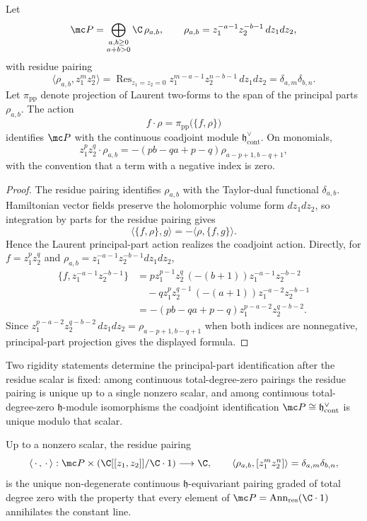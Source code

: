\documentclass[11pt]{memoir}
\begin{document}
\begin{prop}\label{prop:principal-part-coadjoint}
  Let
  $$\mc P=\bigoplus_{\substack{a,b\geq0\\a+b>0}}
    \C\,\rho_{a,b},\qquad
    \rho_{a,b}=z_1^{-a-1}z_2^{-b-1}\,dz_1dz_2,$$
  with residue pairing
  $$\langle \rho_{a,b},z_1^mz_2^n\rangle
    =\operatorname{Res}_{z_1=z_2=0}
      z_1^{m-a-1}z_2^{n-b-1}\,dz_1dz_2
    =\delta_{a,m}\delta_{b,n}.$$
  Let $\pi_{\mathrm{pp}}$ denote projection of Laurent two-forms to the span of
  the principal parts $\rho_{a,b}$. The action
  $$f\cdot\rho=\pi_{\mathrm{pp}}\bigl(\{f,\rho\}\bigr)$$
  identifies $\mc P$ with the continuous coadjoint module
  $\mathfrak h^\vee_{\mathrm{cont}}$. On monomials,
  $$z_1^pz_2^q\cdot\rho_{a,b}
    =-(pb-qa+p-q)\rho_{a-p+1,b-q+1},$$
  with the convention that a term with a negative index is zero.
\end{prop}

\begin{proof}
  The residue pairing identifies $\rho_{a,b}$ with the Taylor-dual functional
  $\delta_{a,b}$. Hamiltonian vector fields preserve the holomorphic volume
  form $dz_1dz_2$, so integration by parts for the residue pairing gives
  $$\langle \{f,\rho\},g\rangle=-\langle\rho,\{f,g\}\rangle.$$
  Hence the Laurent principal-part action realizes the coadjoint action.
  Directly, for $f=z_1^pz_2^q$ and
  $\rho_{a,b}=z_1^{-a-1}z_2^{-b-1}dz_1dz_2$,
  \begin{align*}
  \{f,z_1^{-a-1}z_2^{-b-1}\}
    &=p z_1^{p-1}z_2^q\,(-(b+1))z_1^{-a-1}z_2^{-b-2}\\
    &\quad
      -q z_1^pz_2^{q-1}\,(-(a+1))z_1^{-a-2}z_2^{-b-1}\\
    &=-(pb-qa+p-q)z_1^{p-a-2}z_2^{q-b-2}.
  \end{align*}
  Since
  $z_1^{p-a-2}z_2^{q-b-2}\,dz_1dz_2
    =\rho_{a-p+1,b-q+1}$ when both indices are nonnegative, principal-part
  projection gives the displayed formula.
\end{proof}

Two rigidity statements determine the principal-part identification after the
residue scalar is fixed: among continuous total-degree-zero pairings the
residue pairing is unique up to a single nonzero scalar, and among
continuous total-degree-zero \(\mathfrak h\)-module isomorphisms the
coadjoint identification
$\mc P\cong\mathfrak h^\vee_{\mathrm{cont}}$ is unique modulo that scalar.

\begin{thm}\label{thm:canonical-residue-pairing}
  Up to a nonzero scalar, the residue pairing
  $$\langle\,\cdot\,,\,\cdot\,\rangle:
    \mc P\times(\C[[z_1,z_2]]/\C\cdot1)\longrightarrow\C,\qquad
    \langle\rho_{a,b},[z_1^mz_2^n]\rangle=\delta_{a,m}\delta_{b,n},$$
  is the unique non-degenerate continuous $\mathfrak h$-equivariant
  pairing graded of total degree zero with the property that every element
  of $\mc P=\operatorname{Ann}_{\mathrm{res}}(\C\cdot1)$ annihilates the
  constant line.
\end{thm}
\end{document}
